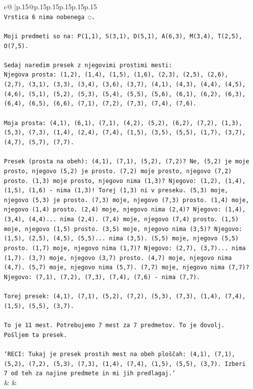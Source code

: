 \documentclass{article}
\begin{document}
{\begin{supertabular}{c@{$\;$}|p{.15\linewidth}@{}p{.15\linewidth}p{.15\linewidth}p{.15\linewidth}p{.15\linewidth}p{.15\linewidth}}
{{{\\ 
\texttt{Vrstica 6 nima nobenega ◌.} \\
\\ 
\texttt{Moji predmeti so na: P(1,1), S(3,1), D(5,1), A(6,3), M(3,4), T(2,5), O(7,5).} \\
\\ 
\texttt{Sedaj naredim presek z njegovimi prostimi mesti:} \\
\texttt{Njegova prosta: (1,2), (1,4), (1,5), (1,6), (2,3), (2,5), (2,6), (2,7), (3,1), (3,3), (3,4), (3,6), (3,7), (4,1), (4,3), (4,4), (4,5), (4,6), (5,1), (5,2), (5,3), (5,4), (5,5), (5,6), (6,1), (6,2), (6,3), (6,4), (6,5), (6,6), (7,1), (7,2), (7,3), (7,4), (7,6).} \\
\\ 
\texttt{Moja prosta: (4,1), (6,1), (7,1), (4,2), (5,2), (6,2), (7,2), (1,3), (5,3), (7,3), (1,4), (2,4), (7,4), (1,5), (3,5), (5,5), (1,7), (3,7), (4,7), (5,7), (7,7).} \\
\\ 
\texttt{Presek (prosta na obeh): (4,1), (7,1), (5,2), (7,2)? Ne, (5,2) je moje prosto, njegovo (5,2) je prosto. (7,2) moje prosto, njegovo (7,2) prosto. (1,3) moje prosto, njegovo nima (1,3)? Njegovo: (1,2), (1,4), (1,5), (1,6) {-} nima (1,3)! Torej (1,3) ni v preseku. (5,3) moje, njegovo (5,3) je prosto. (7,3) moje, njegovo (7,3) prosto. (1,4) moje, njegovo (1,4) prosto. (2,4) moje, njegovo nima (2,4)? Njegovo: (1,4), (3,4), (4,4)... nima (2,4). (7,4) moje, njegovo (7,4) prosto. (1,5) moje, njegovo (1,5) prosto. (3,5) moje, njegovo nima (3,5)? Njegovo: (1,5), (2,5), (4,5), (5,5)... nima (3,5). (5,5) moje, njegovo (5,5) prosto. (1,7) moje, njegovo nima (1,7)? Njegovo: (2,7), (3,7)... nima (1,7). (3,7) moje, njegovo (3,7) prosto. (4,7) moje, njegovo nima (4,7). (5,7) moje, njegovo nima (5,7). (7,7) moje, njegovo nima (7,7)? Njegovo: (7,1), (7,2), (7,3), (7,4), (7,6) {-} nima (7,7).} \\
\\ 
\texttt{Torej presek: (4,1), (7,1), (5,2), (7,2), (5,3), (7,3), (1,4), (7,4), (1,5), (5,5), (3,7).} \\
\\ 
\texttt{To je 11 mest. Potrebujemo 7 mest za 7 predmetov. To je dovolj. Pošljem ta presek.} \\
\\ 
\texttt{`RECI: Tukaj je presek prostih mest na obeh ploščah: (4,1), (7,1), (5,2), (7,2), (5,3), (7,3), (1,4), (7,4), (1,5), (5,5), (3,7). Izberi 7 od teh za najine predmete in mi jih predlagaj.`} \\
            }
        }
    }
    & & \\ \\


\end{supertabular}}
\end{document}
